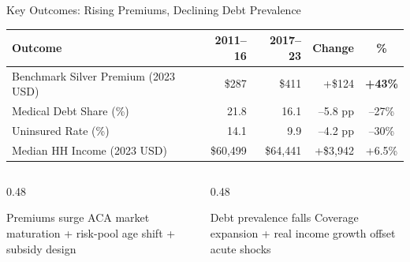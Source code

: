 \documentclass[aspectratio=169,11pt]{beamer}
\newcommand{\emphcolor}[1]{{\color{WarmOrange}\textbf{#1}}}
\newcommand{\tealtext}[1]{{\color{Teal}#1}}
\begin{document}
\begin{frame}{Key Outcomes: Rising Premiums, Declining Debt Prevalence}
  \begin{center}
    \small
    \begin{tabular}{lrrrc}
      \toprule
      \textbf{Outcome} & \textbf{2011--16} & \textbf{2017--23} & \textbf{Change} & \textbf{\%} \\
      \midrule
      Benchmark Silver Premium (2023 USD) & \$287 & \$411 & +\$124 & \emphcolor{+43\%} \\
      Medical Debt Share (\%)             & 21.8  & 16.1  & --5.8 pp & \tealtext{--27\%} \\
      Uninsured Rate (\%)                 & 14.1  & 9.9   & --4.2 pp & \tealtext{--30\%} \\
      Median HH Income (2023 USD)         & \$60,499 & \$64,441 & +\$3,942 & +6.5\% \\
      \bottomrule
    \end{tabular}
  \end{center}
  \vspace{0.5em}
  \begin{columns}[T]
    \begin{column}{0.48\textwidth}
      \begin{alertblock}{Premiums surge}
        ACA market maturation + risk-pool age shift + subsidy design
      \end{alertblock}
    \end{column}
    \begin{column}{0.48\textwidth}
      \begin{exampleblock}{Debt prevalence falls}
        Coverage expansion + real income growth offset acute shocks
      \end{exampleblock}
    \end{column}
  \end{columns}
\end{frame}
\end{document}
